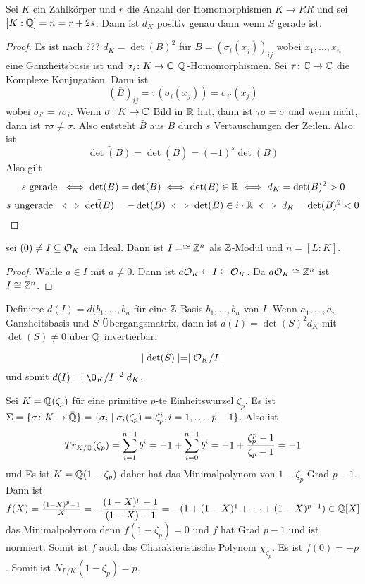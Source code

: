  \begin{Lemma}
 	Sei \(K\) ein Zahlkörper und \(r\) die Anzahl der Homomorphismen \(K\to RR\) und sei \([K:\mathbb{Q}]=n=r+2s\).
 	Dann ist \(d_K\) positiv genau dann wenn \(S\) gerade ist.
 \end{Lemma}
 \begin{proof}
 	Es ist nach ??? \(d_K=\det(B)^2\) für \(B=(\sigma_i(x_j))_{ij}\) wobei \(x_1,\dots,x_n\) eine Ganzheitsbasis ist und \(\sigma_i\colon K\to \mathbb{C}\) \(\mathbb{Q}\)-Homomorphismen.
 	Sei \(\tau\colon \mathbb{C}\to\mathbb{C}\) die Komplexe Konjugation. Dann ist 
 	\[(\bar B)_{ij}=\tau(\sigma_i(x_j))=\sigma_{i'}(x_j)\] wobei \(\sigma_{i'}=\tau\sigma_i\).
 	Wenn \(\sigma\colon K\to \mathbb{C}\) Bild in \(\mathbb{R}\) hat, dann ist \(\tau\sigma=\sigma\) und wenn nicht, dann ist \(\tau\sigma\neq\sigma\).
 	Also entsteht \(\bar B\) aus \(B\) durch \(s\) Vertauschungen der Zeilen.
 	Also ist 
 	\[\bar{\det(B)}=\det(\bar B)=(-1)^s\det(B)\]
 	Also gilt
 	\[s \text{ gerade } \iff \bar{\det(B)}=\det(B) \iff \det(B)\in \mathbb{R}\iff d_K=\det(B)^2>0\]
 	\[s \text{ ungerade } \iff \bar{\det(B)}=-\det(B) \iff \det(B)\in i\cdot\mathbb{R}\iff d_K=\det(B)^2<0\]
 \end{proof}
\begin{Lemma}
    sei \((0)\neq I\subseteq \mathcal{O}_K\) ein Ideal.
    Dann ist \(I=\cong \mathbb{Z}^n\) als \(\mathbb{Z}\)-Modul und \(n=[L:K]\).
\end{Lemma}
\begin{proof}
    Wähle \(a\in I\) mit \(a\neq 0\).
    Dann ist \(a\mathcal{O}_K\subseteq I\subseteq \mathcal{O}_K\).
    Da \(a\mathcal{O}_K\cong \mathbb{Z}^n\) ist \(I\cong \mathbb{Z}^n\).
\end{proof}
\begin{Def}
    Definiere \(d(I)=d(b_1,\dots,b_n\) für eine \(\mathbb{Z}\)-Basis \(b_1,\dots,b_n\) von \(I\).
    Wenn \(a_1,\dots,a_n\) Ganzheitsbasis und \(S\) Übergangsmatrix,
    dann ist \(d(I)=\det(S)^2d_K\) mit \(\det(S)\neq 0\) über \(\mathbb{Q}\) invertierbar.
\end{Def}
\begin{Lemma}
    \[\mid \det(S)\mid =\mid \mathcal{O}_K/I\mid\] und somit 
    \(d(I)=\mid \O_K/I \mid^2d_K\).

\end{Lemma}
\begin{Bsp}
    Sei \(K=\mathbb{Q}(\zeta_p)\) für eine primitive \(p\)-te Einheitswurzel \(\zeta_p\).
    Es ist \(\Sigma=\{\sigma\colon K\to \bar{\mathbb{Q}}\}=\{\sigma_i\mid \sigma_i(\zeta_p)=\zeta_p^i, i=1,\dots,p-1\}\).
    Also ist 
    \[Tr_{K/\mathbb{Q}}(\zeta_p)=\sum_{i=1}^{n-1}b^i=-1+\sum_{i=0}^{n-1}b^i=-1+\dfrac{\zeta_p^p-1}{\zeta_p-1}=-1\] 
    und 
    Es ist \(K=\mathbb{Q}(1-\zeta_p)\) daher hat das Minimalpolynom von \(1-\zeta_p\) Grad \(p-1\).
    Dann ist \(f(X)=\frac{(1-X)^p-1}{X}=-\dfrac{(1-X)^p-1}{(1-X)-1}=-(1+(1-X)^1+\dots+(1-X)^{p-1})\in \mathbb{Q}[X]\) das Minimalpolynom denn \(f(1-\zeta_p)=0\) und 
    \(f\) hat Grad \(p-1\) und ist normiert.
    Somit ist \(f\) auch das Charakteristische Polynom \(\chi_{\zeta_p}\).
    Es ist \(f(0)=-p\). Somit ist \(N_{L/K}(1-\zeta_p)=p\).
\end{Bsp}
